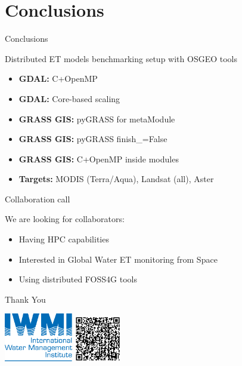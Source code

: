 \documentclass[xcolor=dvipsnames,beamer]{beamer} %
\begin{document}
\section{Conclusions}
\begin{frame}[fragile]{Conclusions}

\begin{block}{Distributed ET models benchmarking setup with OSGEO tools}
\begin{itemize}
 \item {\bf GDAL:} C+OpenMP
 \item {\bf GDAL:} Core-based scaling
 \item {\bf GRASS GIS:} pyGRASS for metaModule
 \item {\bf GRASS GIS:} pyGRASS finish\_=False
 \item {\bf GRASS GIS:} C+OpenMP inside modules
 \item {\bf Targets:} MODIS (Terra/Aqua), Landsat (all), Aster
\end{itemize}
\end{block}

\end{frame}

\begin{frame}[fragile]{Collaboration call}

We are looking for collaborators:
\begin{itemize}
 \item Having HPC capabilities
 \item Interested in Global Water ET monitoring from Space
 \item Using distributed FOSS4G tools
\end{itemize}

\end{frame}


\begin{frame}[fragile]{Thank You}

\vspace{50mm}
\begin{flushright}
 \includegraphics[width=3cm]{iwmi}
 \hspace{10mm}
 \includegraphics[width=2cm]{etb_qr}
\end{flushright}

\end{frame}
\end{document}
